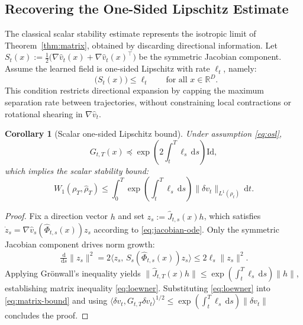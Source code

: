 \documentclass{article}
\newcommand{\R}{\mathbb{R}}
\newcommand{\Id}{\mathrm{Id}}
\newcommand{\dd}{\,\mathrm{d}}
\DeclareMathOperator{\lammax}{\lambda_{\max}}
\theoremstyle{plain}
\newtheorem{corollary}[theorem]{Corollary}
\theoremstyle{definition}
\theoremstyle{remark}
\begin{document}
\subsection{Recovering the One-Sided Lipschitz Estimate}
\label{subsec:scalar}

The classical scalar stability estimate represents the isotropic limit of Theorem~\ref{thm:matrix}, obtained by discarding directional information. Let $S_t(x) := \tfrac12\big(\nabla\hat{v}_t(x) + \nabla\hat{v}_t(x)^\top\big)$ be the symmetric Jacobian component. Assume the learned field is one-sided Lipschitz with rate $\ell_t$, namely:
\begin{equation}
  \lammax\big(S_t(x)\big) \le \ell_t
  \qquad \text{for all } x \in \R^D.
  \label{eq:osl}
\end{equation}
This condition restricts directional expansion by capping the maximum separation rate between trajectories, without constraining local contractions or rotational shearing in $\nabla\hat{v}_t$.

\begin{corollary}[Scalar one-sided Lipschitz bound]
\label{cor:scalar}
Under assumption \eqref{eq:osl},
\begin{equation}
  G_{t,T}(x) \preceq \exp\!\left(2\int_t^T \ell_s \dd s\right) \Id,
  \label{eq:loewner}
\end{equation}
which implies the scalar stability bound:
\begin{equation}
  W_1(\rho_T,\hat{\rho}_T)
  \le \int_0^T \exp\!\left(\int_t^T \ell_s \dd s\right)
  \|\delta v_t\|_{L^1(\rho_t)} \dd t.
  \label{eq:scalar-bound}
\end{equation}
\end{corollary}

\begin{proof}
Fix a direction vector $h$ and set $z_s := \hat{J}_{t,s}(x)h$, which satisfies $\dot{z}_s = \nabla\hat{v}_s(\hat{\Phi}_{t,s}(x)) z_s$ according to \eqref{eq:jacobian-ode}. Only the symmetric Jacobian component drives norm growth:
\[
  \tfrac{\dd}{\dd s}\|z_s\|^2
  = 2\big\langle z_s,\, S_s(\hat{\Phi}_{t,s}(x)) z_s \big\rangle
  \le 2\ell_s \|z_s\|^2.
\]
Applying Grönwall's inequality yields $\|\hat{J}_{t,T}(x)h\| \le \exp\!\left(\int_t^T \ell_s \dd s\right)\|h\|$, establishing matrix inequality \eqref{eq:loewner}. Substituting \eqref{eq:loewner} into \eqref{eq:matrix-bound} and using $\langle \delta v_t, G_{t,T} \delta v_t \rangle^{1/2} \le \exp\!\left(\int_t^T \ell_s \dd s\right) \|\delta v_t\|$ concludes the proof.
\end{proof}
\end{document}

